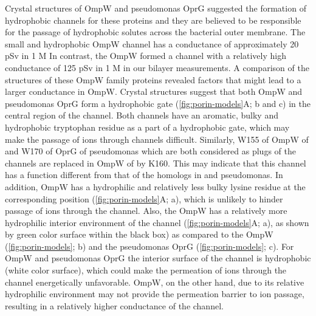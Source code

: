 Crystal structures of \ecoli OmpW and \ac{pseudomonas} OprG suggested the formation of hydrophobic channels for these proteins and they are believed to be responsible for the passage of hydrophobic solutes across the bacterial outer membrane. The small and hydrophobic \ecoli OmpW channel has a conductance of approximately 20 \si{\pico\sievert} in 1 M  In contrast, the \caulobacter OmpW formed a channel with a relatively high conductance of 125 \si{\pico\sievert} in 1 M  in our bilayer measurements. A comparison of the structures of these OmpW family proteins revealed factors that might lead to a larger conductance in \caulobacter OmpW. Crystal structures suggest that both \ecoli OmpW and \ac{pseudomonas} OprG form a hydrophobic gate (\cref{fig:porin-models}A; b and c) in the central region of the channel. Both channels have an aromatic, bulky and hydrophobic tryptophan residue as a part of a hydrophobic gate, which may make the passage of ions through channels difficult. Similarly, W155 of OmpW of \ecoli{} and W170 of OprG of \ac{pseudomonas} which are both considered as plugs of the channels are replaced in OmpW of \caulobacter by K160. This may indicate that this channel has a function different from that of the homologs in \ecoli and \ac{pseudomonas}. In addition, \caulobacter OmpW has a hydrophilic and relatively less bulky lysine residue at the corresponding position (\cref{fig:porin-models}A; a), which is unlikely to hinder passage of ions through the channel. Also, the \caulobacter OmpW has a relatively more hydrophilic interior environment of the channel (\cref{fig:porin-models}A; a), as shown by green color surface within the black box) as compared to the \ecoli OmpW (\cref{fig:porin-models}; b) and the  \ac{pseudomonas} OprG (\cref{fig:porin-models}; c). For \ecoli OmpW and \ac{pseudomonas} OprG the interior surface of the channel is hydrophobic (white color surface), which could make the permeation of ions through the channel energetically unfavorable. \caulobacter OmpW, on the other hand, due to its relative hydrophilic environment may not provide the permeation barrier to ion passage, resulting in a relatively higher conductance of the channel. 

